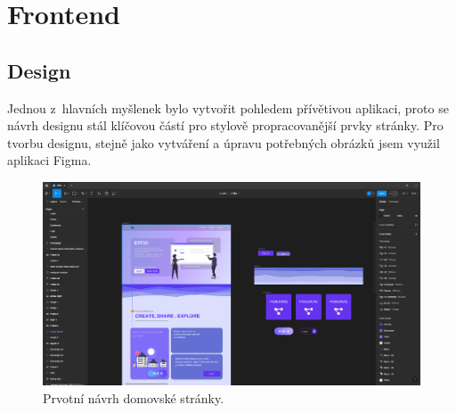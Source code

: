 \documentclass[12pt, a4paper,
openright
]{report}
\begin{document}

\section{Frontend}

\subsection{Design}
Jednou z~hlavních myšlenek bylo vytvořit pohledem přívětivou aplikaci, proto se návrh designu stál klíčovou částí pro stylově propracovanější prvky stránky. Pro tvorbu designu, stejně jako vytváření a úpravu potřebných obrázků jsem využil aplikaci Figma.
\begin{figure}[H]
	\centering %
	\includegraphics[width=0.8\linewidth]{image/figma.png} 
	\caption{Prvotní návrh domovské stránky.} %
	\label{fig:figma} %
\end{figure}
\end{document}
